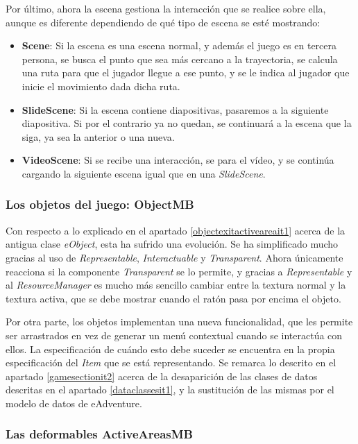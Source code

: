 Por último, ahora la escena gestiona la interacción que se realice sobre ella, aunque es diferente dependiendo de qué tipo de escena se esté mostrando:
\begin{itemize}
	\item \textbf{Scene}: Si la escena es una escena normal, y además el juego es en tercera persona, se busca el punto que sea más cercano a la trayectoria, se calcula una ruta para que el jugador llegue a ese punto, y se le indica al jugador que inicie el movimiento dada dicha ruta.
	
	\item \textbf{SlideScene}: Si la escena contiene diapositivas, pasaremos a la siguiente diapositiva. Si por el contrario ya no quedan, se continuará a la escena que la siga, ya sea la anterior o una nueva.
	
	\item \textbf{VideoScene}: Si se recibe una interacción, se para el vídeo, y se continúa cargando la siguiente escena igual que en una \textit{SlideScene}.
\end{itemize}

\subsubsection{Los objetos del juego: ObjectMB}
\label{itemsit2}

Con respecto a lo explicado en el apartado \ref{objectexitactiveareait1} acerca de la antigua clase \textit{eObject}, esta ha sufrido una evolución. Se ha simplificado mucho gracias al uso de \textit{Representable}, \textit{Interactuable} y \textit{Transparent}. Ahora únicamente reacciona si la componente \textit{Transparent} se lo permite, y gracias a \textit{Representable} y al \textit{ResourceManager} es mucho más sencillo cambiar entre la textura normal y la textura activa, que se debe mostrar cuando el ratón pasa por encima el objeto.

Por otra parte, los objetos implementan una nueva funcionalidad, que les permite ser arrastrados en vez de generar un menú contextual cuando se interactúa con ellos. La especificación de cuándo esto debe suceder se encuentra en la propia especificación del \textit{Item} que se está representando. Se remarca lo descrito en el apartado \ref{gamesectionit2} acerca de la desaparición de las clases de datos descritas en el apartado \ref{dataclassesit1}, y la sustitución de las mismas por el modelo de datos de eAdventure.

\subsubsection{Las deformables ActiveAreasMB}
\label{activeareasectionit2}

